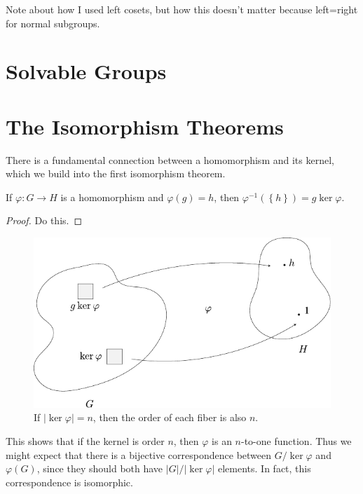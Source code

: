 \documentclass[10pt]{report}
\begin{document}
{\color{red}Note about how I used left cosets, but how this doesn't matter because left=right for normal subgroups.}




\section{Solvable Groups}



\section{The Isomorphism Theorems}

There is a fundamental connection between a homomorphism and its kernel, which we build into the first isomorphism theorem.

\begin{prop}
	If $\varphi:G\to H$ is a homomorphism and $\varphi(g)=h$, then $\varphi^{-1}(\left\{ h \right\})=g \ker \varphi$.
\end{prop}
\begin{proof}
{\color{red}Do this.}
\end{proof}

\begin{figure}[H]
	\centering
	\includegraphics[scale=1]{fig/n-to-1.pdf}
	\caption{If $|\ker\varphi| = n$, then the order of each fiber is also $n$.}
\end{figure}

This shows that if the kernel is order $n$, then $\varphi$ is an $n$-to-one function. Thus we might expect that there is a bijective correspondence between $G/\ker \varphi$ and $\varphi(G)$, since they should both have $|G|/|\ker \varphi|$ elements. In fact, this correspondence is isomorphic.
\end{document}
